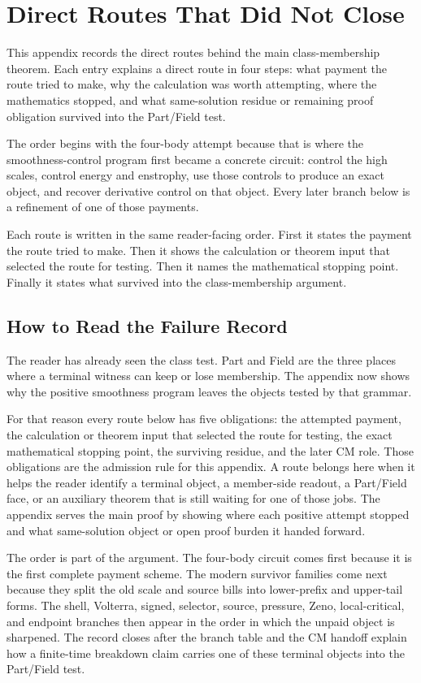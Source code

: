 \section{Direct Routes That Did Not Close}

This appendix records the direct routes behind the main class-membership
theorem.  Each entry explains a direct route in four steps: what payment the
route tried to make, why the calculation was worth attempting, where the
mathematics stopped, and what same-solution residue or remaining proof obligation
survived into the Part/Field test.

The order begins with the four-body attempt because that is where the
smoothness-control program first became a concrete circuit:
control the high scales, control energy and enstrophy, use those controls to
produce an exact object, and recover derivative control on that object.
Every later branch below is a refinement of one of those payments.

Each route is written in the same reader-facing order.  First it states the
payment the route tried to make.  Then it shows the calculation or theorem
input that selected the route for testing.  Then it names the mathematical
stopping point.  Finally it
states what survived into the class-membership argument.

\subsection{How to Read the Failure Record}

The reader has already seen the class test.  Part and Field are the
three places where a terminal witness can keep or lose membership.  The
appendix now shows why the positive smoothness program leaves the objects
tested by that grammar.

For that reason every route below has five obligations:
the attempted payment, the calculation or theorem input that selected the route
for testing, the exact
mathematical stopping point, the surviving residue, and the later CM role.
Those obligations are the admission rule for this appendix.  A route belongs
here when it helps the reader identify a terminal object, a member-side readout,
a Part/Field face, or an auxiliary theorem that is still waiting for one of
those jobs.  The appendix serves the main proof by showing where each positive
attempt stopped and what same-solution object or open proof burden it handed
forward.

The order is part of the argument.
The four-body circuit comes first because it is the first complete payment
scheme.
The modern survivor families come next because they split the old scale and
source bills into lower-prefix and upper-tail forms.
The shell, Volterra, signed, selector, source, pressure, Zeno, local-critical,
and endpoint branches then appear in the order in which the unpaid object is
sharpened.
The record closes after the branch table and the CM handoff explain how a
finite-time breakdown claim carries one of these terminal objects into the
Part/Field test.

